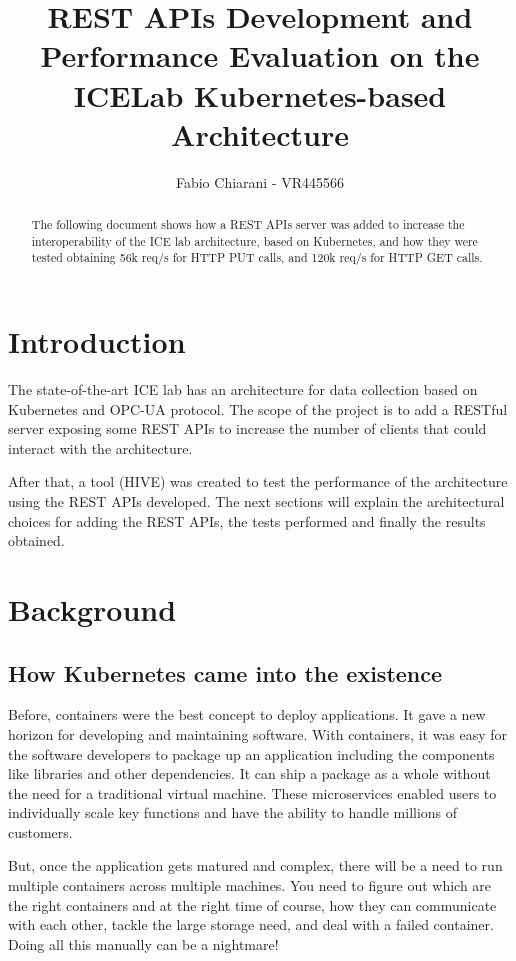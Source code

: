 \documentclass[]{IEEEtran}
\title{REST APIs Development and Performance Evaluation on the ICELab Kubernetes-based Architecture}
\author{Fabio Chiarani - VR445566}
\begin{document}
    \maketitle
    
    \begin{abstract}
    The following document shows how a REST APIs server was added to increase the interoperability of the ICE lab architecture, based on Kubernetes, and how they were tested obtaining 56k req/s for HTTP PUT calls, and 120k req/s for HTTP GET calls.
    \end{abstract}
%    
    \section{Introduction}
    The state-of-the-art ICE lab has an architecture for data collection based on Kubernetes and OPC-UA protocol. The scope of the project is to add a RESTful server exposing some REST APIs to increase the number of clients that could interact with the architecture.
    
After that, a tool (HIVE) was created to test the performance of the architecture using the  REST APIs developed.
The next sections will explain the architectural choices for adding the REST APIs, the tests performed and finally the results obtained.

    \section{Background}
    
        \subsection{How Kubernetes came into the existence}
    Before, containers were the best concept to deploy applications. It gave a new horizon for developing and maintaining software. With containers, it was easy for the software developers to package up an application including the components like libraries and other dependencies. It can ship a package as a whole without the need for a traditional virtual machine.
      These microservices enabled users to individually scale key functions and have the ability to handle millions of customers.
      
      But, once the application gets matured and complex, there will be a need to run multiple containers across multiple machines. You need to figure out which are the right containers and at the right time of course, how they can communicate with each other, tackle the large storage need, and deal with a failed container. Doing all this manually can be a nightmare!
      
\end{document}
